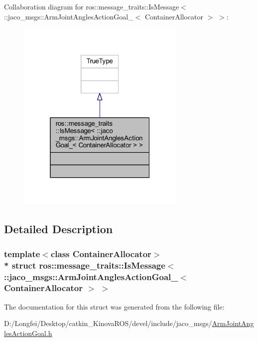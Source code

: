Collaboration diagram for ros\+:\+:message\+\_\+traits\+:\+:Is\+Message$<$ \+:\+:jaco\+\_\+msgs\+:\+:Arm\+Joint\+Angles\+Action\+Goal\+\_\+$<$ Container\+Allocator $>$ $>$\+:
\nopagebreak
\begin{figure}[H]
\begin{center}
\leavevmode
\includegraphics[width=229pt]{d3/d18/structros_1_1message__traits_1_1IsMessage_3_01_1_1jaco__msgs_1_1ArmJointAnglesActionGoal___3_01C42294145d7c48a898aed50b9dbc23c5c}
\end{center}
\end{figure}


\subsection{Detailed Description}
\subsubsection*{template$<$class Container\+Allocator$>$\\*
struct ros\+::message\+\_\+traits\+::\+Is\+Message$<$ \+::jaco\+\_\+msgs\+::\+Arm\+Joint\+Angles\+Action\+Goal\+\_\+$<$ Container\+Allocator $>$ $>$}



The documentation for this struct was generated from the following file\+:\begin{DoxyCompactItemize}
\item 
D\+:/\+Longfei/\+Desktop/catkin\+\_\+\+Kinova\+R\+O\+S/devel/include/jaco\+\_\+msgs/\hyperlink{ArmJointAnglesActionGoal_8h}{Arm\+Joint\+Angles\+Action\+Goal.\+h}\end{DoxyCompactItemize}

